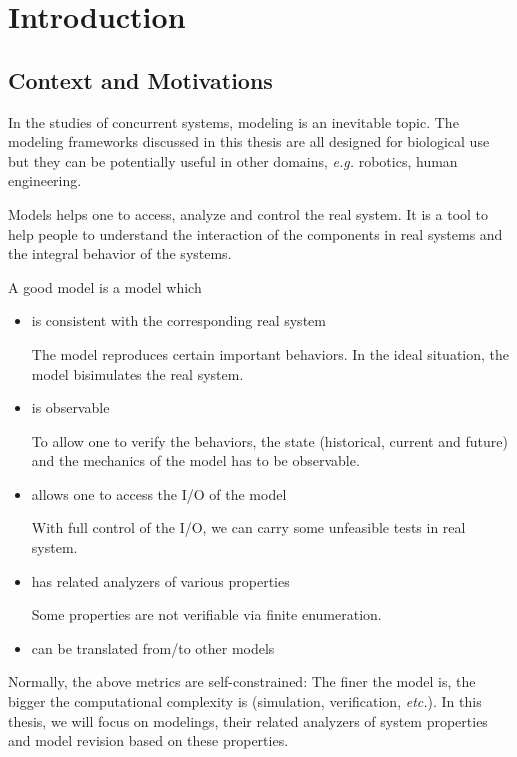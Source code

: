 \chapter{Introduction}
\section{Context and Motivations}
In the studies of concurrent systems, modeling is an inevitable topic.
The modeling frameworks discussed in this thesis are all designed for biological use but they can be potentially useful in other domains, \textit{e.g.} robotics, human engineering.

Models helps one to access, analyze and control the real system. 
It is a tool to help people to understand the interaction of the components in real systems and the integral behavior of the systems.

A good model is a model which

\begin{itemize}
    \item is consistent with the corresponding real system
    
    The model reproduces certain important behaviors.
    In the ideal situation, the model bisimulates the real system.
    \item is observable
    
    To allow one to verify the behaviors, the state (historical, current and future) and the mechanics of the model has to be observable.
    
    \item allows one to access the I/O of the model
    
    With full control of the I/O, we can carry some unfeasible tests in real system.
    \item has related analyzers of various properties
    
    Some properties are not verifiable via finite enumeration.
    \item can be translated from/to other models 
\end{itemize}

Normally, the above metrics are self-constrained:
The finer the model is, the bigger the computational complexity is (simulation, verification, \textit{etc.}).
In this thesis, we will focus on modelings, their related analyzers of system properties and model revision based on these properties.


